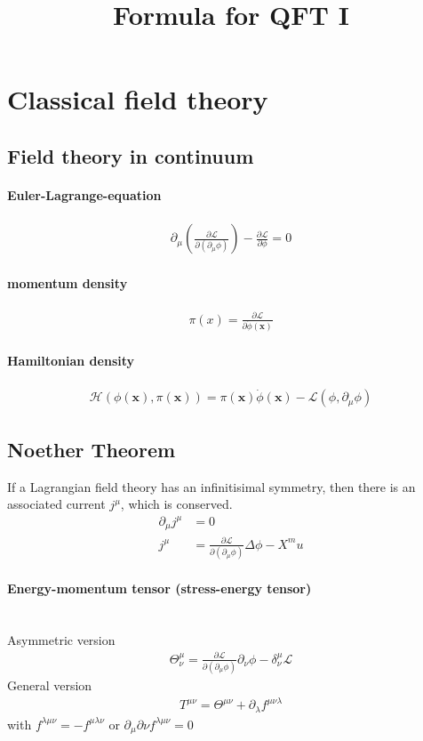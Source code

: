 \documentclass{scrartcl}
\title{Formula for QFT I}
\newcommand{\lag}{\mathcal{L}}
\newcommand{\ham}{\mathcal{H}}
\numberwithin{equation}{section}
\begin{document}
\maketitle

\section{Classical field theory}
\subsection{Field theory in continuum}
\paragraph{Euler-Lagrange-equation}
\begin{align}
	\partial_\mu \left( \frac{\partial \lag}{\partial(\partial_\mu \phi)} \right) - \frac{\partial \mathcal{L}}{\partial \phi} = 0
\end{align}
\paragraph{momentum density}
\begin{align}
	\pi(x) = \frac{\partial \lag}{\partial \dot{\phi}(\pmb{x})}
\end{align}
\paragraph{Hamiltonian density}
\begin{align}
	\ham(\phi(\pmb{x}),\pi(\pmb{x})) = \pi(\pmb{x}) \dot{\phi}(\pmb{x}) - \lag(\phi,\partial_\mu \phi)
\end{align}
\subsection{Noether Theorem}
If a Lagrangian field theory has an infinitisimal symmetry, then there is an associated current $j^\mu$, which is conserved.
\begin{align}
	\partial_\mu j^\mu &= 0 \\
	j^\mu &= \frac{\partial \lag}{\partial (\partial_\mu \phi)} \Delta \phi - X^mu
\end{align}
\paragraph{Energy-momentum tensor (stress-energy tensor)} \hspace{0pt}\\
Asymmetric version
\begin{align}
	\Theta^\mu_\nu = \frac{\partial \lag}{\partial(\partial_\mu \phi)} \partial_\nu \phi - \delta^\mu_\nu \lag
\end{align}
General version
\begin{align}
	T^{\mu\nu} = \Theta^{\mu\nu} + \partial_\lambda f^{\mu\nu\lambda}
\end{align}
with $f^{\lambda\mu\nu}=-f^{\mu\lambda\nu}$ or $\partial_\mu \partial\nu f^{\lambda\mu\nu}=0$
\end{document}
